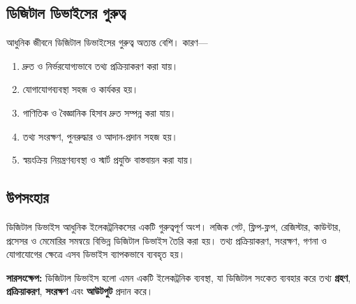 \subsection{ডিজিটাল ডিভাইসের গুরুত্ব}

আধুনিক জীবনে ডিজিটাল ডিভাইসের গুরুত্ব অত্যন্ত বেশি। কারণ—

\begin{enumerate}
    \item দ্রুত ও নির্ভরযোগ্যভাবে তথ্য প্রক্রিয়াকরণ করা যায়।
    \item যোগাযোগব্যবস্থা সহজ ও কার্যকর হয়।
    \item গাণিতিক ও বৈজ্ঞানিক হিসাব দ্রুত সম্পন্ন করা যায়।
    \item তথ্য সংরক্ষণ, পুনরুদ্ধার ও আদান-প্রদান সহজ হয়।
    \item স্বয়ংক্রিয় নিয়ন্ত্রণব্যবস্থা ও স্মার্ট প্রযুক্তি বাস্তবায়ন করা যায়।
\end{enumerate}

\subsection{উপসংহার}

ডিজিটাল ডিভাইস আধুনিক ইলেকট্রনিকসের একটি গুরুত্বপূর্ণ অংশ। লজিক গেট, ফ্লিপ-ফ্লপ, রেজিস্টার, কাউন্টার, প্রসেসর ও মেমোরির সমন্বয়ে বিভিন্ন ডিজিটাল ডিভাইস তৈরি করা হয়। তথ্য প্রক্রিয়াকরণ, সংরক্ষণ, গণনা ও যোগাযোগের ক্ষেত্রে এসব ডিভাইস ব্যাপকভাবে ব্যবহৃত হয়।

\par\begingroup

\textbf{সারসংক্ষেপ:}
ডিজিটাল ডিভাইস হলো এমন একটি ইলেকট্রনিক ব্যবস্থা, যা ডিজিটাল সংকেত ব্যবহার করে তথ্য \textbf{গ্রহণ}, \textbf{প্রক্রিয়াকরণ}, \textbf{সংরক্ষণ} এবং \textbf{আউটপুট} প্রদান করে।
\par\endgroup
